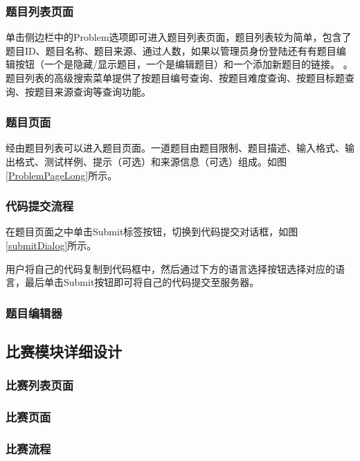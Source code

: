 \subsubsection{题目列表页面}
单击侧边栏中的Problem选项即可进入题目列表页面，题目列表较为简单，包含了题目ID、题目名称、题目来源、通过人数，如果以管理员身份登陆还有有题目编辑按钮（一个是隐藏/显示题目，一个是编辑题目）和一个添加新题目的链接。
。题目列表的高级搜索菜单提供了按题目编号查询、按题目难度查询、按题目标题查询、按题目来源查询等查询功能。


\subsubsection{题目页面}
经由题目列表可以进入题目页面。一道题目由题目限制、题目描述、输入格式、输出格式、测试样例、提示（可选）和来源信息（可选）组成。如图\ref{ProblemPageLong}所示。


\subsubsection{代码提交流程}
在题目页面之中单击Submit标签按钮，切换到代码提交对话框，如图\ref{submitDialog}所示。

用户将自己的代码复制到代码框中，然后通过下方的语言选择按钮选择对应的语言，最后单击Submit按钮即可将自己的代码提交至服务器。


\subsubsection{题目编辑器}

\subsection{比赛模块详细设计}
\subsubsection{比赛列表页面}
\subsubsection{比赛页面}
\subsubsection{比赛流程}
